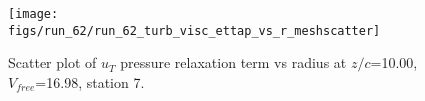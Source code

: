 \begin{figure}[H]
\centering
\texttt{[image: figs/run\_62/run\_62\_turb\_visc\_ettap\_vs\_r\_meshscatter]}
\caption{Scatter plot of $
u_T$ pressure relaxation term vs radius at $z/c$=10.00, $V_{free}$=16.98, station 7.}
\end{figure}


